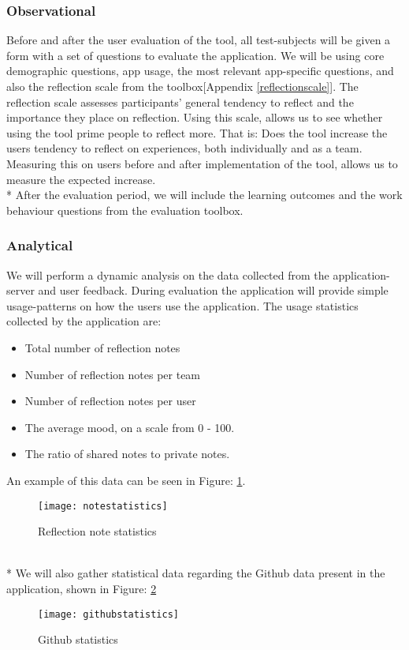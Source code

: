 \subsubsection{Observational}
Before and after the user evaluation of the tool, all test-subjects will be given a form with a set of questions to evaluate the application. We will be using core demographic questions, app usage, the most relevant app-specific questions, and also the reflection scale from the toolbox[Appendix \ref{reflectionscale}]. The reflection scale assesses participants' general tendency to reflect and the importance they place on reflection. Using this scale, allows us to see whether using the tool prime people to reflect more. That is: Does the tool increase the users tendency to reflect on experiences, both individually and as a team. Measuring this on users before and after implementation of the tool, allows us to measure the expected increase. \\*
After the evaluation period,  we will include the learning outcomes and the work behaviour questions from the evaluation toolbox.

\subsubsection{Analytical}
We will perform a dynamic analysis on the data collected from the application-server and user feedback. During evaluation the application will provide simple usage-patterns on how the users use the application. The usage statistics collected by the application are: 
\begin{itemize}
\item Total number of reflection notes
\item Number of reflection notes per team
\item Number of reflection notes per user
\item The average mood, on a scale from 0 - 100.
\item The ratio of shared notes to private notes. 
\end{itemize}
An example of this data can be seen in Figure: \ref{notestatistics}. 
\begin{figure}[!htpb]
\centering
	\texttt{[image: notestatistics]}
\caption{Reflection note statistics}
\label{notestatistics}
\end{figure}
\\*
We will also gather statistical data regarding the Github data present in the application, shown in Figure: \ref{githubstatistics}
\begin{figure}[!htpb]
\centering
	\texttt{[image: githubstatistics]}
\caption{Github statistics}
\label{githubstatistics}
\end{figure}

